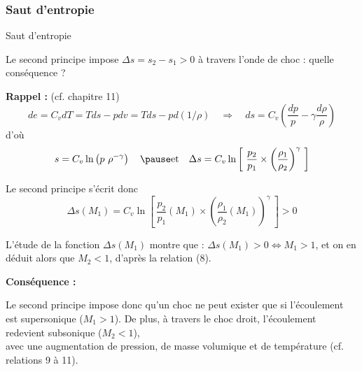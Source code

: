 \subsubsection{Saut d'entropie}
\begin{frame}{Saut d'entropie}

\small

Le \textcolor{vert}{second principe} impose $\Delta s = s_2 - s_1 > 0$ à travers l'onde de choc : quelle conséquence ?

\bigskip \pause

\textbf{Rappel :} (cf. chapitre 11)
\[
	de = C_v dT = Tds - pdv = Tds - p d(1/\rho) 
	\quad \Rightarrow \quad
	ds = C_v \left ( \frac{dp}{p} - \gamma \frac{d\rho}{\rho}\right )
\]
\pause
d'où
\[
	s = C_v \ln \left ( p\ \rho^{-\gamma}\right )
\quad
\pause
\mbox{et} 
\quad
	\Delta s = C_v \ln\left [\ \frac{p_2}{p_1} \times \left ( \frac{\rho_1}{\rho_2} \right )^\gamma\ \right ]
\]

\pause
Le second principe s'écrit donc 
\[
	\Delta s (M_1) 
	= 
	C_v \ln\left [\ \frac{p_2}{p_1}(M_1) \times \left ( \frac{\rho_1}{\rho_2}(M_1) \right )^\gamma\ \right ]
	> 0
\]

\pause
L'étude de la fonction $\Delta s (M_1)$ montre que : $\Delta s (M_1)>0 \Leftrightarrow M_1 > 1$,
et on en déduit alors que $M_2 < 1$, d'après la relation (8).

\bigskip \pause

\textbf{Conséquence :} \medskip

\color{rouge}
Le second principe impose donc qu'un choc ne peut exister que si l'écoulement est supersonique ($M_1>1$).
De plus, à travers le choc droit, l'écoulement redevient subsonique ($M_2<1$), \\
avec une augmentation de pression, de masse volumique et de température (cf. relations 9 à 11).
\vspace{5mm}

\end{frame}



